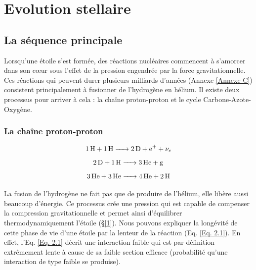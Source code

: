 
\captionsetup{labelformat=default}
	
\chapter{Evolution stellaire}\label{2}

\section{La séquence principale}\label{2.1}

Lorsqu’une étoile s’est formée, des réactions nucléaires commencent à s’amorcer dans son cœur sous l’effet de la pression engendrée par la force gravitationnelle. Ces réactions qui peuvent durer plusieurs milliards d’années (Annexe \ref{Annexe C}) consistent principalement à fusionner de l’hydrogène en hélium. Il existe deux processus pour arriver à cela : la chaîne proton-proton et le cycle Carbone-Azote-Oxygène.

\subsection{La chaîne proton-proton}\label{2.1.1}


\begin{equation}\ce{\ce{1H} + \ce{1H} -> \ce{2D} + \ce{e+} + $\nu_{e}$}\label{Eq. 2.1}\end{equation}
\begin{equation}\ce{\ce{2D} + \ce{1H} -> \ce{3He} + g}\label{Eq. 2.2}\end{equation}
\begin{equation}\ce{\ce{3He} + \ce{3He} -> \ce{4He} + \ce{2H}}\label{Eq. 2.3}\end{equation}\smallskip	


La fusion de l’hydrogène ne fait pas que de produire de l’hélium, elle libère aussi beaucoup d’énergie. Ce processus crée une pression qui est capable de compenser la compression gravitationnelle et permet ainsi d’équilibrer thermodynamiquement l’étoile (§\ref{1}).
Nous pouvons expliquer la longévité de cette phase de vie d’une étoile par la lenteur de la réaction (Eq. \ref{Eq. 2.1}). En effet, l’Eq. \ref{Eq. 2.1} décrit une interaction faible qui est par définition extrêmement lente à cause de sa faible section efficace (probabilité qu’une interaction de type faible se produise).

